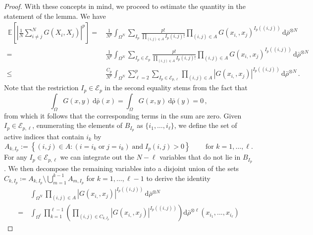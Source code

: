 \documentclass[a4paper,10pt,twoside]{amsart}
\theoremstyle{remark}
\theoremstyle{definition}
\numberwithin{equation}{section}
\newcommand{\0}{{\bf 0}}
\newcommand{\+}{\hspace{-.5ex}+\hspace{-.5ex}}
\begin{document}
\begin{proof}
With these concepts in mind, we proceed to estimate the quantity in the statement of the lemma. We have
\begin{align}
 \, \mathbb{{E}}\left[\left|\frac{1}{N}\sum_{i\neq j}^{N}G(X_{i},X_{j})\right|^{p}\right]
=&\, \frac{{1}}{N^{p}}\int_{\Omega^N}\sum_{I_{p}}\frac{p!}{\prod_{(i,j)\in A}I_p(i,j)! }\prod_{(i,j)\in A}G(x_{i,},x_{j})^{I_p((i,j))}\,\mathrm{{d}}\bar\rho^{\otimes N} \\
=&\, \frac{{1}}{N^{p}}\int_{\Omega^N}\sum_{I_{p}\in\mathcal{{E}}_{p}}\frac{p!}{\prod_{(i,j)\in A}I_p(i,j)! } \prod_{(i,j)\in A}G(x_{i,},x_{j})^{I_p((i,j))}\,\mathrm{{d}}\bar\rho^{\otimes N} \\
\leq & \, \frac{C_p}{N^{p}}\int_{\Omega^N}\sum_{\ell=2}^p\sum_{I_{p}\in\mathcal{{E}}_{p,\ell}} \prod_{(i,j)\in A}|G(x_{i,},x_{j})|^{I_p((i,j))}\,\mathrm{{d}}\bar\rho^{\otimes N} \, .\label{eq:termtosplit}
\end{align}
Note that the restriction $I_p\in\mathcal{E}_p$ in the second equality stems from the fact that 
\begin{equation}
\int_{\Omega}G(x,y)\:\mathrm{{d}\bar\rho}(x)=\int_{\Omega}G(x,y)\:\mathrm{{d}\bar\rho}(y)=0 \, ,
\end{equation}
from which it follows that the corresponding terms in the sum are zero. Given $I_{p} \in \mathcal{E}_{p,\ell}$, enumerating the elements of $B_{I_p}$ as $\{i_1,\dots,i_\ell\}$, we define the set of active indices that contain $i_k$ by
\begin{equation}
A_{k,I_p}:= \left\{ (i,j) \in A: (i =i_k \;\mbox{or}\; j=i_k)\;\mbox{and}\; I_p(i,j)>0 \right\} \, \qquad\mbox{for $k=1,\dots,\ell$.}
\end{equation} 
For any $I_p \in \mathcal{E}_{p,\ell}$ we can integrate out the $N-\ell$ variables that do not lie in $B_{I_p}$. We then decompose the remaining variables into a disjoint union of the sets $C_{k,I_p}\coloneqq A_{k,I_p}\setminus \bigcup_{m=1}^{k-1}A_{m,I_p}$ for $k=1,\dots,\ell-1$ to derive the identity
\begin{align}
&\, \int_{\Omega^N}\prod_{(i,j)\in A}|G(x_{i,},x_{j})|^{I_p((i,j))}\,\mathrm{{d}}\bar\rho^{\otimes N}\\
= & \, \int_{\Omega^{\ell}}\prod_{k=1 }^{\ell-1}\left(\prod_{(i,j)\in C_{k,I_p}}|G(x_{i,},x_{j})|^{I_p((i,j))}\right)\mathrm{{d}}\bar\rho^{\otimes \ell}(x_{i_1},...,x_{i_\ell})\label{eq:breakingupA}
\end{align}


\end{proof}
\end{document}
